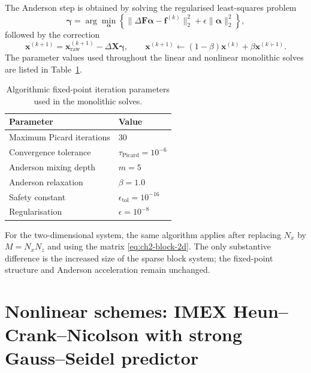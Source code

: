 The Anderson step is obtained by solving the regularised least-squares problem
\begin{equation}
    \boldsymbol{\gamma}
    =
    \arg\min_{\boldsymbol{\alpha}}
    \left\{
    \|\Delta \mathbf{F}\boldsymbol{\alpha} - \mathbf{f}^{(k)}\|_2^2
    +
    \epsilon \|\boldsymbol{\alpha}\|_2^2
    \right\},
\end{equation}
followed by the correction
\begin{equation}
    \mathbf{x}^{(k+1)} = \mathbf{x}^{(k+1)}_{\mathrm{raw}} - \Delta \mathbf{X}\boldsymbol{\gamma},
    \qquad
    \mathbf{x}^{(k+1)} \leftarrow (1-\beta)\mathbf{x}^{(k)} + \beta \mathbf{x}^{(k+1)}.
\end{equation}
The parameter values used throughout the linear and nonlinear monolithic solves are listed in Table~\ref{tab:ch2-picard-params}.

\begin{table}[htbp]
    \centering
    \caption{Algorithmic fixed-point iteration parameters used in the monolithic solves.}
    \label{tab:ch2-picard-params}
    \begin{tabular}{@{}ll@{}}
        \toprule
        \rowcolor{gray!20}
        \textbf{Parameter}        & \textbf{Value}                       \\
        \midrule
        Maximum Picard iterations & $30$                                 \\
        Convergence tolerance     & $\tau_{\mathrm{Picard}} = 10^{-6}$   \\
        Anderson mixing depth     & $m = 5$                              \\
        Anderson relaxation       & $\beta = 1.0$                        \\
        Safety constant           & $\epsilon_{\mathrm{tol}} = 10^{-16}$ \\
        Regularisation            & $\epsilon = 10^{-8}$                 \\
        \bottomrule
    \end{tabular}
\end{table}

For the two-dimensional system, the same algorithm applies after replacing $N_x$ by $M = N_xN_z$ and using the matrix \eqref{eq:ch2-block-2d}. The only substantive difference is the increased size of the sparse block system; the fixed-point structure and Anderson acceleration remain unchanged.

\section{Nonlinear schemes: IMEX Heun--Crank--Nicolson with strong Gauss--Seidel predictor}
\label{sec:ch2-nonlinear}

